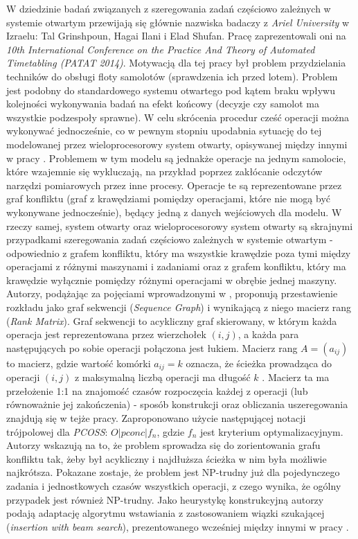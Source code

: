 \documentclass[brudnopis]{xmgr}
\begin{document}
W dziedzinie badań związanych z szeregowania zadań częściowo zależnych w systemie otwartym przewijają się głównie nazwiska badaczy z \emph{Ariel University} w Izraelu: Tal Grinshpoun, Hagai Ilani i Elad Shufan. Pracę \cite{grinshpoun2014partially} zaprezentowali oni na \emph{10th International Conference on the Practice And Theory of Automated Timetabling (PATAT 2014)}. Motywacją dla tej pracy był problem przydzielania techników do obsługi floty samolotów (sprawdzenia ich przed lotem). Problem jest podobny do standardowego systemu otwartego pod kątem braku wpływu kolejności wykonywania badań na efekt końcowy (decyzje czy samolot ma wszystkie podzespoły sprawne). W celu skrócenia procedur cześć operacji można wykonywać jednocześnie, co w pewnym stopniu upodabnia sytuację do tej modelowanej przez wieloprocesorowy system otwarty, opisywanej między innymi w pracy \cite{adakmultiprocessor}. Problemem w tym modelu są jednakże operacje na jednym samolocie, które wzajemnie się wykluczają, na przykład poprzez zakłócanie odczytów narzędzi pomiarowych przez inne procesy. Operacje te są reprezentowane przez graf konfliktu (graf z krawędziami pomiędzy operacjami, które nie mogą być wykonywane jednocześnie), będący jedną z danych wejściowych dla modelu. W rzeczy samej, system otwarty oraz wieloprocesorowy system otwarty są skrajnymi przypadkami szeregowania zadań częściowo zależnych w systemie otwartym - odpowiednio z grafem konfliktu, który ma wszystkie krawędzie poza tymi między operacjami z różnymi maszynami i zadaniami oraz z grafem konfliktu, który ma krawędzie wyłącznie pomiędzy różnymi operacjami w obrębie jednej maszyny.\\
Autorzy, podążając za pojęciami wprowadzonymi w \cite{brasel2006matrices}, proponują przestawienie rozkładu jako graf sekwencji (\emph{Sequence Graph}) i wynikającą z niego macierz rang (\emph{Rank Matrix}). Graf sekwencji to acykliczny graf skierowany, w którym każda operacja jest reprezentowana przez wierzchołek $(i, j)$, a każda para następujących po sobie operacji połączona jest łukiem. Macierz rang $A = (a_{ij})$ to macierz, gdzie wartość komórki $a_{ij} = k$ oznacza, że ścieżka prowadząca do operacji $(i, j)$ z maksymalną liczbą operacji ma długość $k$ \cite{brasel2008heuristic}. Macierz ta ma przełożenie 1:1 na znajomość czasów rozpoczęcia każdej z operacji (lub równoważnie jej zakończenia) - sposób konstrukcji oraz obliczania uszeregowania znajdują się w tejże pracy. Zaproponowano użycie następującej notacji trójpolowej dla \emph{PCOSS}: $O|pconc|f_n$, gdzie $f_n$ jest kryterium optymalizacyjnym. Autorzy wskazują na to, że problem sprowadza się do zorientowania grafu konfliktu tak, żeby był acykliczny i najdłuższa ścieżka w nim była możliwie najkrótsza. Pokazane zostaje, że problem jest NP-trudny już dla pojedynczego zadania i jednostkowych czasów wszystkich operacji, z czego wynika, że ogólny przypadek jest również NP-trudny. Jako heurystykę konstrukcyjną autorzy podają adaptację algorytmu wstawiania z zastosowaniem wiązki szukającej (\emph{insertion with beam search}), prezentowanego wcześniej między innymi w pracy \cite{brasel1993constructive}.
\medskip
\end{document}

